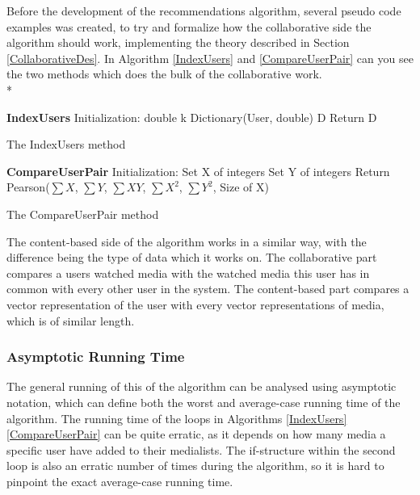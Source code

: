 Before the development of the recommendations algorithm, several pseudo code examples was created, to try and formalize how the collaborative side the algorithm should work, implementing the theory described in Section \ref{CollaborativeDes}. In Algorithm \ref{IndexUsers} and \ref{CompareUserPair} can you see the two methods which does the bulk of the collaborative work. \\*

\begin{algorithm}[H]
	\DontPrintSemicolon
	\textbf{IndexUsers}\;
	Initialization:\;
	double k\;
	Dictionary(User, double) D\;
	Return D\;
	\label{IndexUsers}
	\caption{The IndexUsers method}
\end{algorithm}


\begin{algorithm}[H]
	\DontPrintSemicolon
	\;
	\textbf{CompareUserPair}\;
	Initialization:\;
	Set X of integers\;
	Set Y of integers\;
	Return Pearson($\sum{X}$, $\sum{Y}$, $\sum{XY}$, $\sum{X^2}$, $\sum{Y^2}$, Size of X)
	\label{CompareUserPair}
	\caption{The CompareUserPair method}
\end{algorithm}

\newpage

The content-based side of the algorithm works in a similar way, with the difference being the type of data which it works on. The collaborative part compares a users watched media with the watched media this user has in common with every other user in the system. The content-based part compares a vector representation of the user with every vector representations of media, which is of similar length.

\subsubsection{Asymptotic Running Time}

The general running of this of the algorithm can be analysed using asymptotic notation, which can define both the worst and average-case running time of the algorithm. The running time of the loops in Algorithms \ref{IndexUsers} \ref{CompareUserPair} can be quite erratic, as it depends on how many media a specific user have added to their medialists. The if-structure within the second loop is also an erratic number of times during the algorithm, so it is hard to pinpoint the exact average-case running time.

